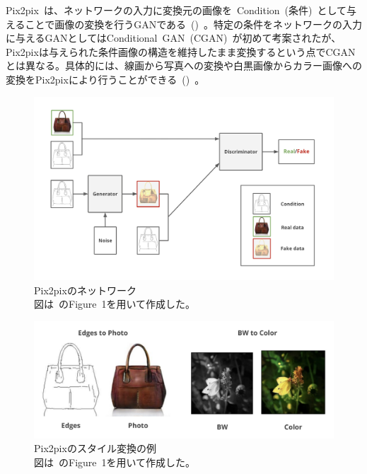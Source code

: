 Pix2pix~\cite{pix2pix}は、ネットワークの入力に変換元の画像を~Condition~(条件)~として与えることで画像の変換を行うGANである~()~。特定の条件をネットワークの入力に与えるGANとしてはConditional~GAN~(CGAN)~\cite{CGAN}が初めて考案されたが、Pix2pixは与えられた条件画像の構造を維持したまま変換するという点でCGANとは異なる。具体的には、線画から写真への変換や白黒画像からカラー画像への変換をPix2pixにより行うことができる~()~。

\begin{figure}[b]
\centering
\includegraphics[width=0.9\columnwidth]{figure/pix2pix_net.png}
\caption[Pix2pixのネットワーク]{Pix2pixのネットワーク\\
図は~\cite{pix2pix}のFigure~1を用いて作成した。}
\label{fig:pix2pix_net}
\end{figure}

\clearpage

\begin{figure}[t]
\centering
\includegraphics[width=\columnwidth]{figure/pix2pix_img.png}
\caption[Pix2pixのスタイル変換の例]{Pix2pixのスタイル変換の例\\
図は~\cite{pix2pix}のFigure~1を用いて作成した。}
\label{fig:pix2pix_img}
\end{figure}

